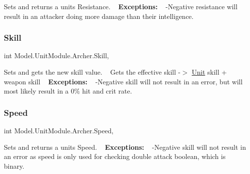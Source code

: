 Sets and returns a unit\textquotesingle{}s Resistance. ~\newline
 {\bfseries Exceptions\+:} ~\newline
 -\/\+Negative resistance will result in an attacker doing more damage than their intelligence. \hypertarget{class_model_1_1_unit_module_1_1_archer_ad2b77a7ad32761658101c22051c35f7e}{}\label{class_model_1_1_unit_module_1_1_archer_ad2b77a7ad32761658101c22051c35f7e} 
\subsubsection{\texorpdfstring{Skill}{Skill}}
{\footnotesize\ttfamily int Model.\+Unit\+Module.\+Archer.\+Skill\hspace{0.3cm}{\ttfamily [get]}, {\ttfamily [set]}}

Sets and gets the new skill value. ~\newline
 Gets the effective skill -\/$>$ \hyperlink{interface_model_1_1_unit_module_1_1_unit}{Unit} skill + weapon skill ~\newline
 {\bfseries Exceptions\+:} ~\newline
 -\/\+Negative skill will not result in an error, but will most likely result in a 0\% hit and crit rate. \hypertarget{class_model_1_1_unit_module_1_1_archer_ae944f41f10572d4a183229726950eeec}{}\label{class_model_1_1_unit_module_1_1_archer_ae944f41f10572d4a183229726950eeec} 
\subsubsection{\texorpdfstring{Speed}{Speed}}
{\footnotesize\ttfamily int Model.\+Unit\+Module.\+Archer.\+Speed\hspace{0.3cm}{\ttfamily [get]}, {\ttfamily [set]}}

Sets and returns a unit\textquotesingle{}s Speed. ~\newline
 {\bfseries Exceptions\+:} ~\newline
 -\/\+Negative skill will not result in an error as speed is only used for checking double attack boolean, which is binary. \hypertarget{class_model_1_1_unit_module_1_1_archer_a4dd2b6dcabc11e4d5fcfa0856a9f85aa}{}\label{class_model_1_1_unit_module_1_1_archer_a4dd2b6dcabc11e4d5fcfa0856a9f85aa} 
